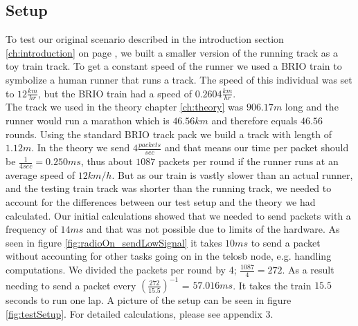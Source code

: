 \subsection{Setup}\label{sc:setup}

To test our original scenario described in the introduction section \ref{ch:introduction} on page \pageref{ch:introduction}, we built a smaller version of the running track as a toy train track. To get a constant speed of the runner we used a BRIO train to symbolize a human runner that runs a track. The speed of this individual was set to $12\frac{km}{hr}$, but the BRIO train had a speed of $0.2604\frac{km}{hr}$. \\

\noindent The track we used in the theory chapter \ref{ch:theory} was $906.17m$ long and the runner would run a marathon which is $46.56km$ and therefore equals $46.56$ rounds. Using the standard BRIO track pack we build a track with length of $1.12m$. In the theory we send $4\frac{packets}{sec}$ and that means our time per packet should be $\frac{1}{4sec} = 0.250ms$, thus about $1087$ packets per round if the runner runs at an average speed of $12km/h$. But as our train is vastly slower than an actual runner, and the testing train track was shorter than the running track, we needed to account for the differences between our test setup and the theory we had calculated. Our initial calculations showed that we needed to send packets with a frequency of $14ms$ and that was not possible due to limits of the hardware. As seen in figure \ref{fig:radioOn_sendLowSignal} it takes $10ms$ to send a packet without accounting for other tasks going on in the telosb node, e.g. handling computations. We divided the packets per round by 4; $\frac{1087}{4} = 272$. As a result needing to send a packet every $(\frac{272}{15.5})^{-1}$ = $57.016 ms$. It takes the train $15.5$ seconds to run one lap. A picture of the setup can be seen in figure \ref{fig:testSetup}. For detailed calculations, please see appendix 3.
